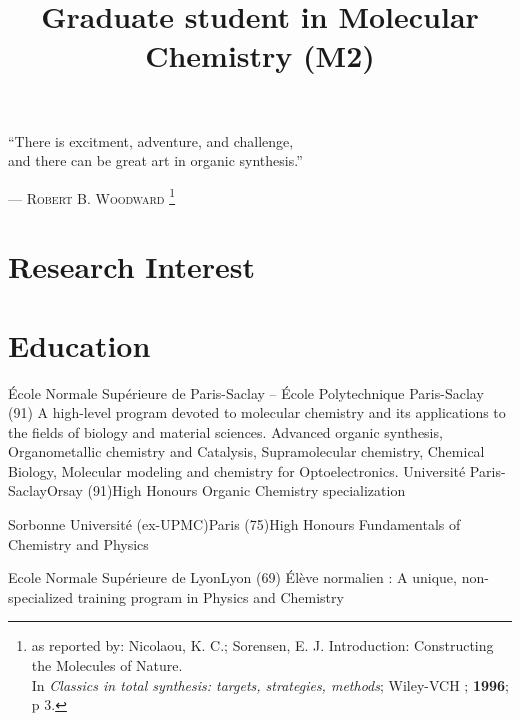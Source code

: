 \documentclass[11pt,a4paper,sans]{moderncv}
\title{Graduate student in Molecular Chemistry (M2)}
\begin{document}
\makecvtitle

{
    \vspace{-5mm}
    \centering
    \color{quote}
    \rmfamily
    ``There is excitment, adventure, and challenge,\\
    and there can be great art in organic synthesis.''\\
}

\begin{flushright}
    {\color{author}
    {---}  \textsc{Robert B. Woodward}
    \footnote{as reported by: Nicolaou, K. C.; Sorensen, E. J. Introduction: Constructing the Molecules of Nature. \\
    In \textit{Classics in total synthesis: targets, strategies, methods}; Wiley-VCH ; \textbf{1996}; p 3.
}}
\end{flushright}
%
\section{Research Interest}
%
%
\section{Education}
%
{{\newline}École Normale Supérieure de Paris-Saclay -- École Polytechnique}%
{Paris-Saclay (91)}{}%
{A high-level program devoted to molecular chemistry and its applications %
to the fields of biology and material sciences. \newline
Advanced organic synthesis, Organometallic chemistry and Catalysis, %
Supramolecular chemistry, Chemical Biology, %
Molecular modeling and chemistry for Optoelectronics.%
}
%
\vspace{5mm}
%
%
{Université Paris-Saclay}{Orsay (91)}{High Honours}%
{Organic Chemistry specialization}

%
{Sorbonne Université (ex-UPMC)}{Paris (75)}{High Honours}%
{Fundamentals of Chemistry and Physics}

%
{Ecole Normale Supérieure de Lyon}{Lyon (69)}{}%
{Élève normalien : A unique, non-specialized training program in Physics and Chemistry}
\end{document}
